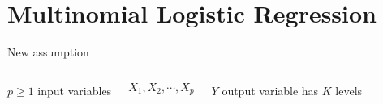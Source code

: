 \documentclass[aspectratio=169,usenames,dvipsnames]{beamer}
\begin{document}
	

\section{Multinomial Logistic Regression}
\begin{frame}[c]{New assumption}
\begin{columns}
\centering
	$p\geq 1$ input variables 

	$$ 
	X_1,X_2,\cdots, X_p
	$$

\centering
$Y$ output variable has $K$ levels 
\end{columns}
\end{frame}
\end{document}
